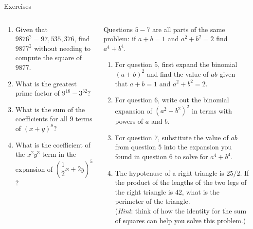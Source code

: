 \documentclass[9pt,aspectratio=169]{beamer}
\begin{document}
\begin{frame}{Exercises}
  \begin{columns}[T]
    \begin{column}{0.5\textwidth}
      \begin{enumerate}
        \item Given that $9876^2 = 97{,}535{,}376$, find $9877^2$ without needing to compute the square of $9877$.
        \item What is the greatest prime factor of $9^18 - 3^32$?
        \item What is the sum of the coefficients for all $9$ terms of $(x + y)^8$?
        \item What is the coefficient of the $x^2y^3$ term in the expansion of $\left(\dfrac{1}{2} x + 2y\right)^5$?
        \seti
      \end{enumerate}
    \end{column}
    \begin{column}{0.5\textwidth}
      Questions $5-7$ are all parts of the same problem: if $a + b = 1$ and $a^2 + b^2 = 2$ find $a^4 + b^4.$
      \begin{enumerate}
        \conti
        \item For question 5, first expand the binomial $(a + b)^2$ and find the value of $ab$ given that $a + b = 1$ and $a^2 + b^2 = 2.$
        \item For question 6, write out the binomial expansion of $(a^2 + b^2)^2$ in terms with powers of $a$ and $b$.
        \item For question 7, substitute the value of $ab$ from question 5 into the expansion you found in question 6 to solve for $a^4 + b^4$.
        \item The hypotenuse of a right triangle is $25/2$.  If the product of the lengths of the two legs of the right triangle is $42$, what is the perimeter of the triangle.\\
        (\emph{Hint}: think of how the identity for the sum of squares can help you solve this problem.)     
      \end{enumerate}
    \end{column}
  \end{columns}
\end{frame}
\end{document}
